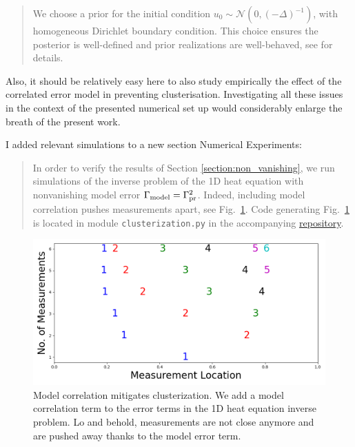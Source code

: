 \begin{quote}
  We choose a prior for the initial condition $u_0 \sim \mathcal{N}(0,
  (-\Delta)^{-1})$, with homogeneous Dirichlet boundary
  condition. This choice ensures the posterior is well-defined and
  prior realizations are well-behaved, see \cite[Theorem 3.1 and Lemma
    6.25]{Stuart10} for details.
\end{quote}

  
\RC Also, it should be relatively easy here to also study empirically
the effect of the correlated error model in preventing
clusterisation. Investigating all these issues in the context of the
presented numerical set up would considerably enlarge the breath of
the present work.

\AR I added relevant simulations to a new section Numerical
Experiments:


\begin{quote}
  In order to verify the results of Section
  \ref{section:non_vanishing}, we run simulations of the inverse
  problem of the 1D heat equation with nonvanishing model error
  \(\Gamma_{\textup{model}} = \Gamma_{\textup{pr}}^2 \). Indeed, including model correlation pushes
  measurements apart, see Fig.~\ref{fig:corr_errors}. Code generating
  Fig.~\ref{fig:corr_errors} is located in module
  \texttt{clusterization.py} in the accompanying
  \href{https://github.com/yairdaon/OED}{repository}.
\end{quote}
\begin{figure}
  \centering
  \includegraphics[height=0.5\textwidth]{figs/dst_modelError4.png}
  \caption{Model correlation mitigates clusterization. We add a
    model correlation term to the error terms in the 1D heat
    equation inverse problem. Lo and behold, measurements are not
    close anymore and are pushed away thanks to the model error
    term.}
    \label{fig:corr_errors}
\end{figure}

